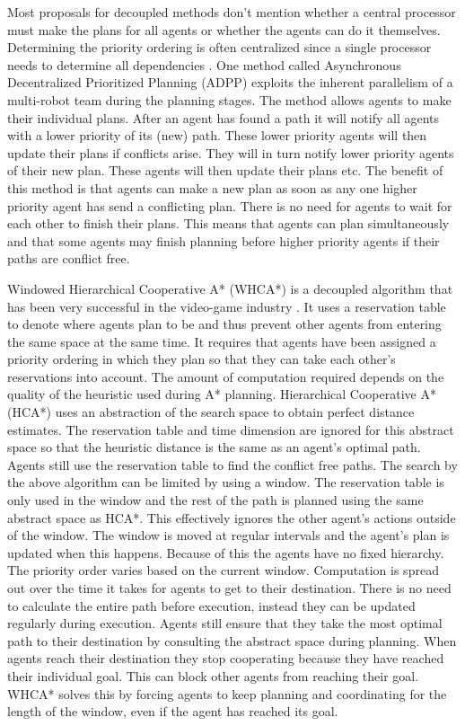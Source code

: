 Most proposals for decoupled methods don't mention whether a central processor
must make the plans for all agents or whether the agents can do it themselves.
Determining the priority ordering is often centralized since a
single processor needs to determine all dependencies \cite{bennewitz2002}. One
method called Asynchronous Decentralized Prioritized Planning (ADPP)
\cite{cap2012} exploits the inherent parallelism of a multi-robot team during
the planning stages. The method allows
agents to make their individual plans. After an agent has found a path it will
notify all agents with a lower priority of its (new) path. These lower priority
agents will then update their plans if conflicts arise. They will in turn
notify lower priority agents of their new plan. These agents will then update
their plans etc. The benefit of
this method is that agents can make a new plan as soon as any one higher
priority agent has send a conflicting plan. There is no need for agents to
wait for each other to finish their plans. This means that agents can plan
simultaneously and that some agents may finish planning before higher priority
agents if their paths are conflict free.

Windowed Hierarchical Cooperative A* (WHCA*) is a decoupled algorithm that has
been very successful in the video-game industry \cite{silver2005,botea2013}. It
uses a
reservation table to denote where agents plan to be and thus prevent other
agents from entering the same space at the same time. It requires that agents
have been assigned a priority ordering in which they plan so that they can take
each other's reservations into account. The amount of computation required
depends on the quality of the heuristic used during A* planning. Hierarchical
Cooperative A* (HCA*) uses an abstraction of the search space to obtain perfect
distance estimates. The reservation table and time dimension are ignored for
this abstract space so that the heuristic distance is the same as an agent's
optimal path. Agents still use the reservation table to find the conflict free
paths. The search by the above algorithm can be limited by using a window. The
reservation table is only used in the window and the rest of the path is
planned using the same abstract space as HCA*. This effectively ignores the
other agent's actions outside of the window. The window is moved at regular
intervals and the agent's plan is updated when this happens. Because of this
the agents have no fixed hierarchy. The priority order varies based on the
current window. Computation is spread out over the time it takes for agents to
get to their destination. There is no need to calculate the entire path before
execution, instead they can be updated regularly during execution. Agents still
ensure that they take the most optimal path to their destination by consulting
the abstract space during planning. When agents reach their destination they
stop cooperating because they have reached their individual goal. This can
block other agents from reaching their goal. WHCA* solves this by forcing
agents to keep planning and coordinating for the length of the window, even if
the agent has reached its goal.

